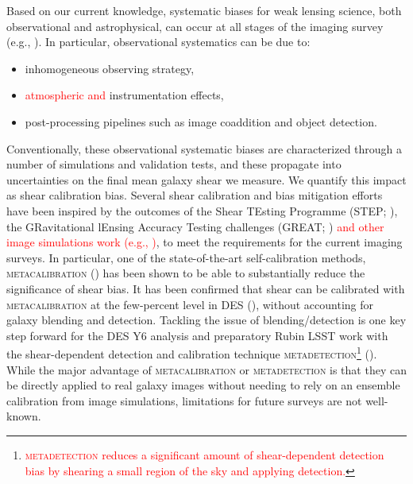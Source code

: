 \documentclass[fleqn,usenatbib]{mnras}
\begin{document}
Based on our current knowledge, systematic biases for weak lensing science, both observational and astrophysical, can occur at all stages of the imaging survey (e.g., \citealt{2018ARA&A..56..393M}). In particular, observational systematics can be due to: 
\begin{itemize}
    \item inhomogeneous observing strategy,
    \item \textcolor{red}{atmospheric and} instrumentation effects,
    \item post-processing pipelines such as image coaddition and object detection.
\end{itemize} 
Conventionally, these observational systematic biases are characterized through a number of simulations and validation tests, and these propagate into uncertainties on the final mean galaxy shear we measure. We quantify this impact as shear calibration bias. Several shear calibration and bias mitigation efforts have been inspired by the outcomes of the Shear TEsting Programme (STEP; \citealt{2006MNRAS.368.1323H, 2007MNRAS.376...13M}), the GRavitational lEnsing Accuracy Testing challenges (GREAT; \citealt{2010MNRAS.405.2044B, 2013ApJS..205...12K, 2015MNRAS.450.2963M}) \textcolor{red}{and other image simulations work (e.g., \citealt{2017MNRAS.468.3295H})}, to meet the requirements for the current imaging surveys. In particular, one of the state-of-the-art self-calibration methods, \textsc{metacalibration} (\citealt{2017arXiv170202600H, 2017ApJ...841...24S}) has been shown to be able to substantially reduce the significance of shear bias. It has been confirmed that shear can be calibrated with \textsc{metacalibration} at the few-percent level in DES (\citealt{2018MNRAS.481.1149Z, 2020arXiv201103408G}), without accounting for galaxy blending and detection. Tackling the issue of blending/detection is one key step forward for the DES Y6 analysis and preparatory Rubin LSST work with the shear-dependent detection and calibration technique \textsc{metadetection}\footnote{\textcolor{red}{\textsc{metadetection} reduces a significant amount of shear-dependent detection bias by shearing a small region of the sky and applying detection.} } (\citealt{2020ApJ...902..138S}). While the major advantage of \textsc{metacalibration} or \textsc{metadetection} is that they can be directly applied to real galaxy images without needing to rely on an ensemble calibration from image simulations, limitations for future surveys are not well-known. 
\end{document}
